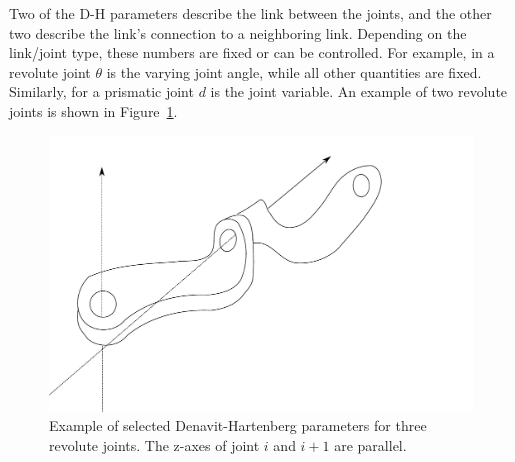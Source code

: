Two of the D-H parameters describe the link between the joints, and the other two describe the link's connection to a neighboring link. Depending on the link/joint type, these numbers are fixed or can be controlled. For example, in a revolute joint $ \theta$ is the varying joint angle, while all other quantities are fixed.  Similarly, for a prismatic joint $ d$ is the joint variable. An example of two revolute joints is shown in Figure~\ref{fig:denavit}.

\begin{figure}
	\centering
		\includegraphics[width=\textwidth]{figs/denavit-hartenberg}
	\caption{Example of selected Denavit-Hartenberg parameters for three revolute joints. The z-axes of joint $i$ and $i+1$ are parallel.
	\label{fig:denavit}}
\end{figure}



